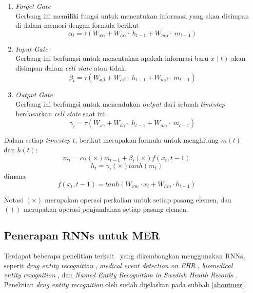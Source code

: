 \begin{enumerate}
	\item \textit{Forget Gate}\\
	Gerbang ini memiliki fungsi untuk menentukan informasi yang akan disimpan di dalam memori dengan formula berikut
	\begin{equation}\label{eq:forget_lstm}
	\alpha_{t}=\tau(W_{x\alpha}+W_{h\alpha}\cdot~h_{t-1}+W_{m\alpha}\cdot~m_{t-1})
	\end{equation}
	
	\item \textit{Input Gate}\\
	Gerbang ini berfungsi untuk menentukan apakah informasi baru $ x(t) $ akan disimpan dalam \textit{cell state} atau tidak. 
	\begin{equation}\label{eq:input_lstm}
	\beta_{t}=\tau(W_{x\beta}+W_{h\beta}\cdot~h_{t-1}+W_{m\beta}\cdot~m_{t-1})
	\end{equation}
	
	\item \textit{Output Gate}\\
	Gerbang ini berfungsi untuk menendukan \textit{output} dari sebuah \textit{timestep} berdasarkan \textit{cell state} saat ini.
	\begin{equation}\label{eq:output_lstm}
	\gamma_{t}=\tau(W_{x\gamma}+W_{h\gamma}\cdot~h_{t-1}+W_{m\gamma}\cdot~m_{t-1})
	\end{equation}
	
\end{enumerate}

Dalam setiap \textit{timestep} $ t $, berikut merupakan formula untuk menghitung $ m(t) $ dan $ h(t) $:
\begin{equation}\label{eq:mt}
m_{t}=\alpha_{t} (\times) m_{t-1} + \beta_{t} (\times) f(x_{t},{t-1})
\end{equation}
\begin{equation}\label{eq:ht}
h_{t}=\gamma_{t} (\times) tanh(m_{t})
\end{equation}
dimana
\begin{equation}\label{eq:hf}
f(x_{t},{t-1})=tanh(W_{xm} \cdot x_{t} + W_{hm} \cdot h_{t-1})
\end{equation}

Notasi $ (\times) $ merupakan operasi perkalian untuk setiap pasang elemen, dan $ (+) $ merupakan operasi penjumlahan setiap pasang elemen.

\subsection{Penerapan RNNs untuk MER}
Terdapat beberapa penelitian terkait \mer~yang dikembangkan menggunakan RNNs, seperti \textit{drug entity recognition} \citep{mujiono2016new}, \textit{medical event detection on EHR} \citep{jagannatha2016bidirectional}, \textit{biomedical entity recognition} \citep{limsopatham2016learning}, dan \textit{Named Entity Recognition in Swedish Health Records} \citep{almgren2016named}. Penelitian \textit{drug entity recognition} oleh \cite{mujiono2016new} sudah dijelaskan pada subbab \ref{aboutmer}.

